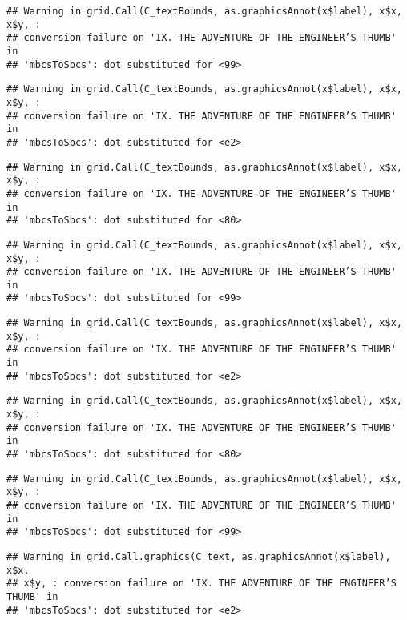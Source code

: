\documentclass[
]{book}
\begin{document}
\begin{verbatim}
## Warning in grid.Call(C_textBounds, as.graphicsAnnot(x$label), x$x, x$y, :
## conversion failure on 'IX. THE ADVENTURE OF THE ENGINEER’S THUMB' in
## 'mbcsToSbcs': dot substituted for <99>
\end{verbatim}

\begin{verbatim}
## Warning in grid.Call(C_textBounds, as.graphicsAnnot(x$label), x$x, x$y, :
## conversion failure on 'IX. THE ADVENTURE OF THE ENGINEER’S THUMB' in
## 'mbcsToSbcs': dot substituted for <e2>
\end{verbatim}

\begin{verbatim}
## Warning in grid.Call(C_textBounds, as.graphicsAnnot(x$label), x$x, x$y, :
## conversion failure on 'IX. THE ADVENTURE OF THE ENGINEER’S THUMB' in
## 'mbcsToSbcs': dot substituted for <80>
\end{verbatim}

\begin{verbatim}
## Warning in grid.Call(C_textBounds, as.graphicsAnnot(x$label), x$x, x$y, :
## conversion failure on 'IX. THE ADVENTURE OF THE ENGINEER’S THUMB' in
## 'mbcsToSbcs': dot substituted for <99>
\end{verbatim}

\begin{verbatim}
## Warning in grid.Call(C_textBounds, as.graphicsAnnot(x$label), x$x, x$y, :
## conversion failure on 'IX. THE ADVENTURE OF THE ENGINEER’S THUMB' in
## 'mbcsToSbcs': dot substituted for <e2>
\end{verbatim}

\begin{verbatim}
## Warning in grid.Call(C_textBounds, as.graphicsAnnot(x$label), x$x, x$y, :
## conversion failure on 'IX. THE ADVENTURE OF THE ENGINEER’S THUMB' in
## 'mbcsToSbcs': dot substituted for <80>
\end{verbatim}

\begin{verbatim}
## Warning in grid.Call(C_textBounds, as.graphicsAnnot(x$label), x$x, x$y, :
## conversion failure on 'IX. THE ADVENTURE OF THE ENGINEER’S THUMB' in
## 'mbcsToSbcs': dot substituted for <99>
\end{verbatim}

\begin{verbatim}
## Warning in grid.Call.graphics(C_text, as.graphicsAnnot(x$label), x$x,
## x$y, : conversion failure on 'IX. THE ADVENTURE OF THE ENGINEER’S THUMB' in
## 'mbcsToSbcs': dot substituted for <e2>
\end{verbatim}
\end{document}
